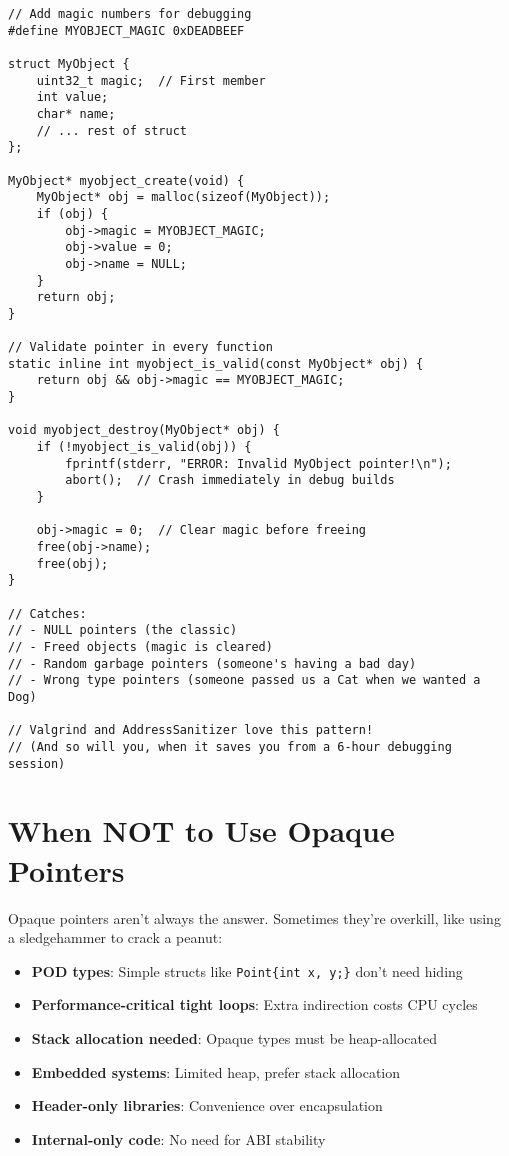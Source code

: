 \begin{lstlisting}
// Add magic numbers for debugging
#define MYOBJECT_MAGIC 0xDEADBEEF

struct MyObject {
    uint32_t magic;  // First member
    int value;
    char* name;
    // ... rest of struct
};

MyObject* myobject_create(void) {
    MyObject* obj = malloc(sizeof(MyObject));
    if (obj) {
        obj->magic = MYOBJECT_MAGIC;
        obj->value = 0;
        obj->name = NULL;
    }
    return obj;
}

// Validate pointer in every function
static inline int myobject_is_valid(const MyObject* obj) {
    return obj && obj->magic == MYOBJECT_MAGIC;
}

void myobject_destroy(MyObject* obj) {
    if (!myobject_is_valid(obj)) {
        fprintf(stderr, "ERROR: Invalid MyObject pointer!\n");
        abort();  // Crash immediately in debug builds
    }

    obj->magic = 0;  // Clear magic before freeing
    free(obj->name);
    free(obj);
}

// Catches:
// - NULL pointers (the classic)
// - Freed objects (magic is cleared)
// - Random garbage pointers (someone's having a bad day)
// - Wrong type pointers (someone passed us a Cat when we wanted a Dog)

// Valgrind and AddressSanitizer love this pattern!
// (And so will you, when it saves you from a 6-hour debugging session)
\end{lstlisting}

\section{When NOT to Use Opaque Pointers}

Opaque pointers aren't always the answer. Sometimes they're overkill, like using a sledgehammer to crack a peanut:

\begin{itemize}
    \item \textbf{POD types}: Simple structs like \texttt{Point\{int x, y;\}} don't need hiding
    \item \textbf{Performance-critical tight loops}: Extra indirection costs CPU cycles
    \item \textbf{Stack allocation needed}: Opaque types must be heap-allocated
    \item \textbf{Embedded systems}: Limited heap, prefer stack allocation
    \item \textbf{Header-only libraries}: Convenience over encapsulation
    \item \textbf{Internal-only code}: No need for ABI stability
\end{itemize}


